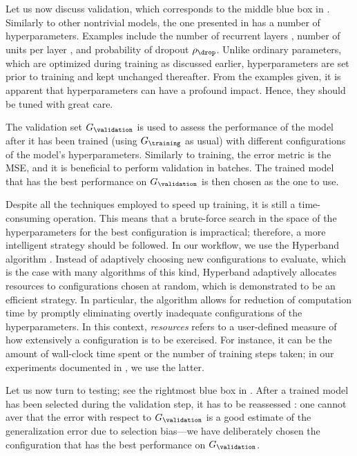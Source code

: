 Let us now discuss validation, which corresponds to the middle blue box in
. Similarly to other nontrivial models, the one presented
in  has a number of hyperparameters. Examples
include the number of recurrent layers \nl, number of units per layer \nu, and
probability of dropout $\rho_\drop$. Unlike ordinary parameters, which are
optimized during training as discussed earlier, hyperparameters are set prior to
training and kept unchanged thereafter. From the examples given, it is apparent
that hyperparameters can have a profound impact. Hence, they should be tuned
with great care.

The validation set $G_\validation$ is used to assess the performance of the
model after it has been trained (using $G_\training$ as usual) with different
configurations of the model's hyperparameters. Similarly to training, the error
metric is the \ac{MSE}, and it is beneficial to perform validation in batches.
The trained model that has the best performance on $G_\validation$ is then
chosen as the one to use.

Despite all the techniques employed to speed up training, it is still a
time-consuming operation. This means that a brute-force search in the space of
the hyperparameters for the best configuration is impractical; therefore, a more
intelligent strategy should be followed. In our workflow, we use the Hyperband
algorithm \cite{li2016}. Instead of adaptively choosing new configurations to
evaluate, which is the case with many algorithms of this kind, Hyperband
adaptively allocates resources to configurations chosen at random, which is
demonstrated to be an efficient strategy. In particular, the algorithm allows
for reduction of computation time by promptly eliminating overtly inadequate
configurations of the hyperparameters. In this context, \emph{resources} refers
to a user-defined measure of how extensively a configuration is to be exercised.
For instance, it can be the amount of wall-clock time spent or the number of
training steps taken; in our experiments documented in , we
use the latter.

Let us now turn to testing; see the rightmost blue box in .
After a trained model has been selected during the validation step, it has to be
reassessed \cite{hastie2013}: one cannot aver that the error with respect to
$G_\validation$ is a good estimate of the generalization error due to selection
bias---we have deliberately chosen the configuration that has the best
performance on $G_\validation$.

